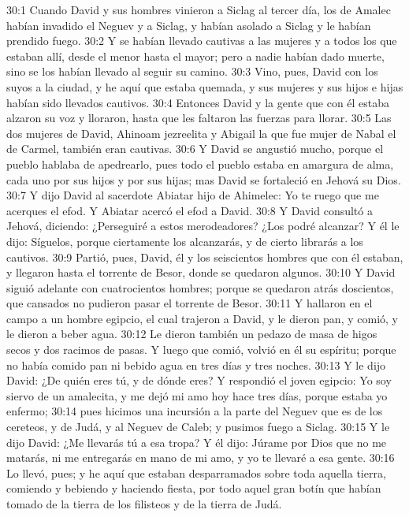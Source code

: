 30:1 Cuando David y sus hombres vinieron a Siclag al tercer día, los de Amalec habían invadido el Neguev y a Siclag, y habían asolado a Siclag y le habían prendido fuego.  
30:2 Y se habían llevado cautivas a las mujeres y a todos los que estaban allí, desde el menor hasta el mayor; pero a nadie habían dado muerte, sino se los habían llevado al seguir su camino.  
30:3 Vino, pues, David con los suyos a la ciudad, y he aquí que estaba quemada, y sus mujeres y sus hijos e hijas habían sido llevados cautivos.  
30:4 Entonces David y la gente que con él estaba alzaron su voz y lloraron, hasta que les faltaron las fuerzas para llorar.  
30:5 Las dos mujeres de David, Ahinoam jezreelita y Abigail la que fue mujer de Nabal el de Carmel, también eran cautivas. 
30:6 Y David se angustió mucho, porque el pueblo hablaba de apedrearlo, pues todo el pueblo estaba en amargura de alma, cada uno por sus hijos y por sus hijas; mas David se fortaleció en Jehová su Dios.  
30:7 Y dijo David al sacerdote Abiatar hijo de Ahimelec: Yo te ruego que me acerques el efod. Y Abiatar acercó el efod a David.  
30:8 Y David consultó a Jehová, diciendo: ¿Perseguiré a estos merodeadores? ¿Los podré alcanzar? Y él le dijo: Síguelos, porque ciertamente los alcanzarás, y de cierto librarás a los cautivos.  
30:9 Partió, pues, David, él y los seiscientos hombres que con él estaban, y llegaron hasta el torrente de Besor, donde se quedaron algunos.  
30:10 Y David siguió adelante con cuatrocientos hombres; porque se quedaron atrás doscientos, que cansados no pudieron pasar el torrente de Besor.  
30:11 Y hallaron en el campo a un hombre egipcio, el cual trajeron a David, y le dieron pan, y comió, y le dieron a beber agua.  
30:12 Le dieron también un pedazo de masa de higos secos y dos racimos de pasas. Y luego que comió, volvió en él su espíritu; porque no había comido pan ni bebido agua en tres días y tres noches.  
30:13 Y le dijo David: ¿De quién eres tú, y de dónde eres? Y respondió el joven egipcio: Yo soy siervo de un amalecita, y me dejó mi amo hoy hace tres días, porque estaba yo enfermo;  
30:14 pues hicimos una incursión a la parte del Neguev que es de los cereteos, y de Judá, y al Neguev de Caleb; y pusimos fuego a Siclag.  
30:15 Y le dijo David: ¿Me llevarás tú a esa tropa? Y él dijo: Júrame por Dios que no me matarás, ni me entregarás en mano de mi amo, y yo te llevaré a esa gente.  
30:16 Lo llevó, pues; y he aquí que estaban desparramados sobre toda aquella tierra, comiendo y bebiendo y haciendo fiesta, por todo aquel gran botín que habían tomado de la tierra de los filisteos y de la tierra de Judá.  
